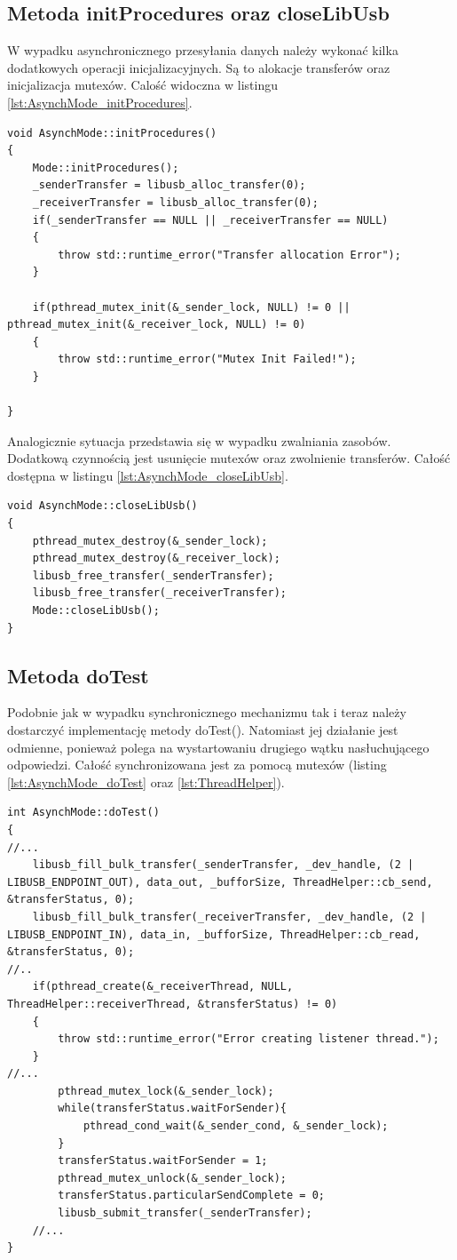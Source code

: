 \documentclass{BscUS}
\begin{document}
\subsection{Metoda initProcedures oraz closeLibUsb}
W wypadku asynchronicznego przesyłania danych należy wykonać kilka dodatkowych operacji inicjalizacyjnych. Są to alokacje transferów oraz inicjalizacja mutexów.
Calość widoczna w listingu \ref{lst:AsynchMode_initProcedures}.
\begin{lstlisting}[caption={Metoda AsynchMode::initProcedures},label={lst:AsynchMode_initProcedures}]
void AsynchMode::initProcedures()
{
	Mode::initProcedures();
	_senderTransfer = libusb_alloc_transfer(0);	
	_receiverTransfer = libusb_alloc_transfer(0);
	if(_senderTransfer == NULL || _receiverTransfer == NULL)
	{
		throw std::runtime_error("Transfer allocation Error");
	}

	if(pthread_mutex_init(&_sender_lock, NULL) != 0 || pthread_mutex_init(&_receiver_lock, NULL) != 0)
	{
		throw std::runtime_error("Mutex Init Failed!");
	}

}
\end{lstlisting}
Analogicznie sytuacja przedstawia się w wypadku zwalniania zasobów. Dodatkową czynnością jest usunięcie mutexów oraz zwolnienie transferów. Całość dostępna w listingu \ref{lst:AsynchMode_closeLibUsb}.
\begin{lstlisting}[caption={Metoda AsynchMode::closeLibUsb},label={lst:AsynchMode_closeLibUsb}]
void AsynchMode::closeLibUsb()
{
	pthread_mutex_destroy(&_sender_lock);
	pthread_mutex_destroy(&_receiver_lock);
	libusb_free_transfer(_senderTransfer);
	libusb_free_transfer(_receiverTransfer);
	Mode::closeLibUsb();
}
\end{lstlisting}
\subsection{Metoda doTest}
Podobnie jak w wypadku synchronicznego mechanizmu tak i teraz należy dostarczyć implementację metody doTest(). Natomiast jej działanie jest odmienne, ponieważ polega na wystartowaniu drugiego wątku nasłuchującego odpowiedzi. Całość synchronizowana jest za pomocą mutexów (listing \ref{lst:AsynchMode_doTest} oraz \ref{lst:ThreadHelper}).
\begin{lstlisting}[caption={Metoda AsynchMode::doTest()},label={lst:AsynchMode_doTest}]
int AsynchMode::doTest()
{
//...
	libusb_fill_bulk_transfer(_senderTransfer, _dev_handle, (2 | LIBUSB_ENDPOINT_OUT), data_out, _bufforSize, ThreadHelper::cb_send, &transferStatus, 0);
	libusb_fill_bulk_transfer(_receiverTransfer, _dev_handle, (2 | LIBUSB_ENDPOINT_IN), data_in, _bufforSize, ThreadHelper::cb_read, &transferStatus, 0);
//..
	if(pthread_create(&_receiverThread, NULL, ThreadHelper::receiverThread, &transferStatus) != 0)
	{
		throw std::runtime_error("Error creating listener thread.");
	}
//... 
		pthread_mutex_lock(&_sender_lock);
		while(transferStatus.waitForSender){
			pthread_cond_wait(&_sender_cond, &_sender_lock);
		}
		transferStatus.waitForSender = 1;
		pthread_mutex_unlock(&_sender_lock);
		transferStatus.particularSendComplete = 0;
		libusb_submit_transfer(_senderTransfer);
	//...
}

\end{lstlisting}
\end{document}
